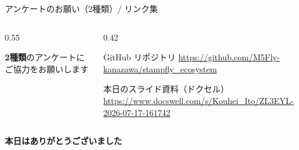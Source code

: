\begin{frame}{アンケートのお願い（2種類）/ リンク集}
  \begin{columns}[c]
    \begin{column}{0.55\textwidth}
      \centering
      \vspace{0.3em}

      {\footnotesize \textbf{2種類}のアンケートにご協力をお願いします}
    \end{column}
    \begin{column}{0.42\textwidth}
      \begin{block}{GitHub リポジトリ}
        {\footnotesize\url{https://github.com/M5Fly-kanazawa/stampfly_ecosystem}}
      \end{block}

      \vspace{0.3em}

      \begin{block}{本日のスライド資料（ドクセル）}
        {\footnotesize\url{https://www.docswell.com/s/Kouhei_Ito/ZL3EYL-2026-07-17-161742}}
      \end{block}
    \end{column}
  \end{columns}

  \vspace{0.5em}

  \begin{center}
    \Large\bfseries\textcolor{sfblue}{本日はありがとうございました}
  \end{center}
\end{frame}
